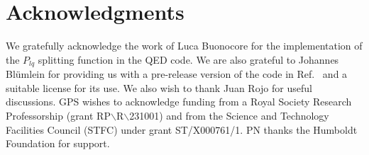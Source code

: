 \documentclass[preprint,1p,a4paper,11pt]{elsarticle}
\begin{document}
\section*{Acknowledgments}


We gratefully acknowledge the work of Luca Buonocore
for the implementation of the $P_{lq}$ splitting function in the QED code.
%
We are also grateful to Johannes Bl\"umlein for providing us with a
pre-release version of the code in Ref.~\cite{BlumleinCode} and a
suitable license for its use.
%
We also wish to thank Juan Rojo for useful discussions. 
%
GPS wishes to acknowledge funding from a Royal Society Research
Professorship (grant RP$\backslash$R$\backslash$231001) and from the Science and
Technology Facilities Council (STFC) under grant ST/X000761/1.
%
PN thanks the Humboldt Foundation for support. 
%
\appendix





%
\end{document}
